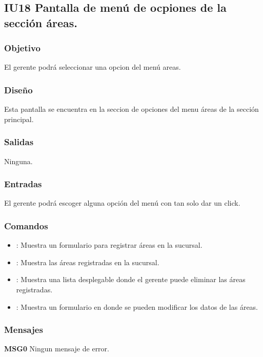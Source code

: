 \subsection{IU18 Pantalla de menú de ocpiones de la sección áreas.}

\subsubsection{Objetivo}
	El gerente podrá seleccionar una opcion del menú areas.

\subsubsection{Diseño}
	Esta pantalla se encuentra en la seccion de opciones del menu áreas de la sección principal. 


\subsubsection{Salidas}

	Ninguna.

\subsubsection{Entradas}
El gerente podrá escoger alguna opción del menú con tan solo dar un click.

\subsubsection{Comandos}
\begin{itemize}
	\item {}: Muestra un formulario para registrar áreas en la sucursal.
	\item {}: Muestra las áreas registradas en la sucursal.
	\item {}: Muestra una lista desplegable donde el gerente puede eliminar las áreas registradas.
	\item {}: Muestra un formulario en donde se pueden modificar los datos de las áreas.
\end{itemize}

\subsubsection{Mensajes}
	\begin{Citemize}
		\item {\bf MSG0} Ningun mensaje de error.
	\end{Citemize}

